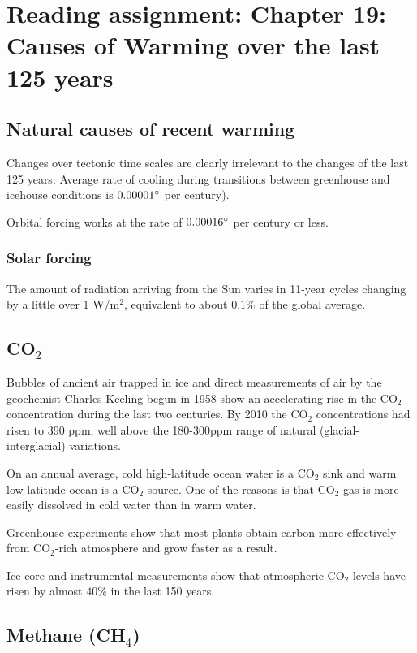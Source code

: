 \section{Reading assignment: Chapter 19: Causes of Warming over the last 125
years}

\subsection{Natural causes of recent warming}
Changes over tectonic time scales are clearly irrelevant to the changes of the
last 125 years. Average rate of cooling during transitions between greenhouse
and icehouse conditions is $0.00001\degree$ per century).

Orbital forcing works at the rate of $0.00016 \degree$ per century or less.

\subsubsection{Solar forcing}

The amount of radiation arriving from the Sun varies in 11-year cycles changing
by a little over 1 W/m$^2$, equivalent to about $0.1\%$ of the global average.

\subsection{CO$_2$}

Bubbles of ancient air trapped in ice and direct measurements of air by the
geochemist Charles Keeling begun in 1958 show an accelerating rise in the
CO$_2$ concentration during the last two centuries. By 2010 the CO$_2$
concentrations had risen to 390 ppm, well above the 180-300ppm range of natural
(glacial-interglacial) variations.

On an annual average, cold high-latitude ocean water is a CO$_2$ sink and warm
low-latitude ocean is a CO$_2$ source.
One of the reasons is that CO$_2$ gas is more easily dissolved in cold water
than in warm water.

Greenhouse experiments show that most plants obtain carbon more effectively
from CO$_2$-rich atmosphere and grow faster as a result.

Ice core and instrumental measurements show that atmospheric CO$_2$ levels have
risen by almost $40\%$ in the last 150 years.

\subsection{Methane (CH$_4$)}


